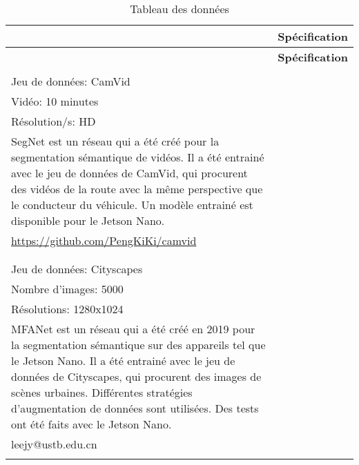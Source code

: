 {
   \newcommand\rownumber{\stepcounter{magicrownumbers}\arabic{magicrownumbers}}
   \vspace{0.1em} %
   \begin{longtable}[t]{@{}p{1em}|p{35em}} %
      \caption{Tableau des données}\label{tab:datasets}\\
      & \textbf{Spécification} \\
      \hline
      \endfirsthead
      & \textbf{Spécification} \\
      \hline
      \endhead
      \endfoot
      \endlastfoot
      \hline
      \rownumber & \begin{tabular}[t]{@{}p{35em}@{}}
         Réseau: SegNet\\Jeu de données: CamVid\\Vidéo: 10 minutes\\Résolution/s: HD\\
         \hline
         SegNet est un réseau qui a été créé pour la segmentation sémantique de vidéos. Il a été entrainé avec le jeu de données de CamVid, qui procurent des vidéos de la route avec la même perspective que le conducteur du véhicule. Un modèle entrainé est disponible pour le Jetson Nano.\\
         \url{https://github.com/PengKiKi/camvid}\\
      \end{tabular}\\
      \hline
      \rownumber & \begin{tabular}[t]{@{}p{35em}@{}}
         Réseau: MFANet\\Jeu de données: Cityscapes\\Nombre d'images: 5000\\Résolutions: 1280x1024\\
         \hline
         MFANet est un réseau qui a été créé en 2019 pour la segmentation sémantique sur des appareils tel que le Jetson Nano. Il a été entrainé avec le jeu de données de Cityscapes, qui procurent des images de scènes urbaines. Différentes stratégies d'augmentation de données sont utilisées. Des tests ont été faits avec le Jetson Nano.\\
         leejy@ustb.edu.cn\\
      \end{tabular}\\

\end{longtable}}
